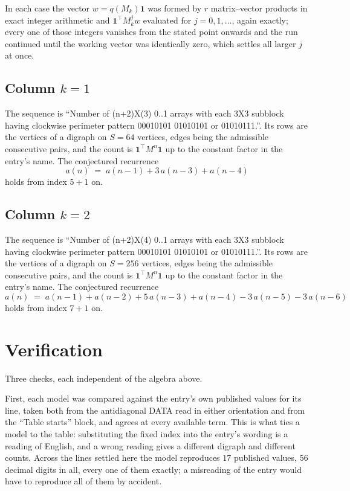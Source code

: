\documentclass[11pt,a4paper]{article}
\theoremstyle{plain}
\theoremstyle{definition}
\begin{document}
In each case the vector $w=q(M_k)\mathbf{1}$ was formed by $r$ matrix--vector products in
exact integer arithmetic and $\mathbf{1}^{\!\top}M_k^{j}w$ evaluated for $j=0,1,\dots$,
again exactly; every one of those integers vanishes from the stated point onwards and the run
continued until the working vector was identically zero, which settles all larger $j$ at once.

\subsection*{Column $k$$=1$}
The sequence is ``Number of (n+2)X(3) 0..1 arrays with each 3X3 subblock having clockwise perimeter pattern 00010101 01010101 or 01010111.''. Its rows are the vertices of a digraph on
$S=64$ vertices, edges being the admissible consecutive pairs, and the count is
$\mathbf{1}^{\!\top}M^{n}\mathbf{1}$ up to the constant factor in the entry's name.
The conjectured recurrence
\[
a(n)\;=\;a(n-1) + 3\,a(n-3) + a(n-4)
\]
holds from index $5+1$ on.

\subsection*{Column $k$$=2$}
The sequence is ``Number of (n+2)X(4) 0..1 arrays with each 3X3 subblock having clockwise perimeter pattern 00010101 01010101 or 01010111.''. Its rows are the vertices of a digraph on
$S=256$ vertices, edges being the admissible consecutive pairs, and the count is
$\mathbf{1}^{\!\top}M^{n}\mathbf{1}$ up to the constant factor in the entry's name.
The conjectured recurrence
\[
a(n)\;=\;a(n-1) + a(n-2) + 5\,a(n-3) + a(n-4) - 3\,a(n-5) - 3\,a(n-6)
\]
holds from index $7+1$ on.

\section{Verification}

Three checks, each independent of the algebra above.

First, each model was compared against the entry's own published values for its line, taken
both from the antidiagonal DATA read in either orientation and from the ``Table starts''
block, and agrees at every available term. This is what ties a model to the table:
substituting the fixed index into the entry's wording is a reading of English, and a wrong
reading gives a different digraph and different counts. Across the lines settled here the
model reproduces $17$ published values, $56$ decimal digits in all, every one of
them exactly; a misreading of the entry would have to reproduce all of them by accident.
\end{document}
